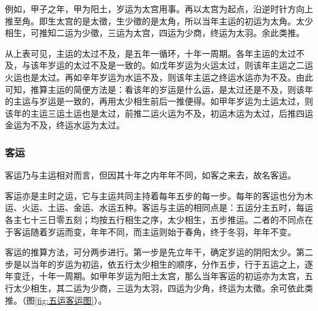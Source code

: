 \documentclass[12pt]{ctexbook}
\begin{document}
例如，甲子之年，甲为阳土，岁运为太宫用事。再以太宫为起点，沿逆时针方向上推至角。即生太宫的是太徵，生少徵的是太角，所以当年主运的初运为太角。太少相生，可推知二运为少徵，三运为太宫，四运为少商，终运为太羽。余此类推。

从上表可见，主运的太过不及，是五年一循环，十年一周期。各年主运的太过不及，与该年岁运的太过不及是一致的。如戊年岁运为火运太过，则该年主运之二运火运也是太过。再如辛年岁运为水运不及，则该年主运之终运水运亦为不及。由此可知，推算主运的简便方法是：看该年的岁运是什么运，是太过还是不及，则该年的主运与岁运是一致的，再用太少相生前后一推便得。如甲年岁运为土运太过，则该年的主运三运土运也是太过，前推二运火运为不及，初运木运为太过，后推四运金运为不及，终运水运为太过。

\subsubsection{客运}%

客运乃与主运相对而言，但因其十年之内年年不同，如客之来去，故名客运。

客运亦是主时之运，它与主运共同主持着每年五步的每一步。每年的客运也分为木运、火运、土运、金运、水运五种。客运与主运的相同点是：五运分主五时，每运各主七十三日零五刻；均按五行相生之序，太少相生，五步推运。二者的不同点在于客运随着岁运而变，年年不同，而主运则始于春角，终于冬羽，年年不变。

客运的推算方法，可分两步进行。第一步是先立年干，确定岁运的阴阳太少。第二步是以当年的岁运为初运，依五行太少相生的顺序，分作五步，行于五运之上，逐年变迁，十年一周期。如甲年岁运为阳土太宫，那么当年客运的初运亦为太宫，五行太少相生，其二运为少商，三运为太羽，四运为少角，终运为太徵。余可依此类推。（图\ref{fig:五运客运图}）。

\end{document}

